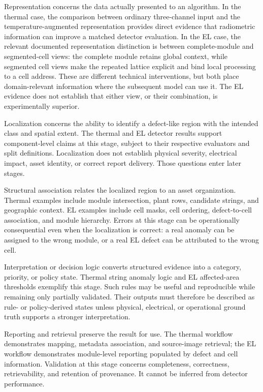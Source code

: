 \documentclass[12pt,a4paper]{report}
\begin{document}
Representation concerns the data actually presented to an algorithm. In the thermal case, the comparison between ordinary three-channel input and the temperature-augmented representation provides direct evidence that radiometric information can improve a matched detector evaluation. In the EL case, the relevant documented representation distinction is between complete-module and segmented-cell views: the complete module retains global context, while segmented cell views make the repeated lattice explicit and bind local processing to a cell address. These are different technical interventions, but both place domain-relevant information where the subsequent model can use it. The EL evidence does not establish that either view, or their combination, is experimentally superior.

Localization concerns the ability to identify a defect-like region with the intended class and spatial extent. The thermal and EL detector results support component-level claims at this stage, subject to their respective evaluators and split definitions. Localization does not establish physical severity, electrical impact, asset identity, or correct report delivery. Those questions enter later stages.

Structural association relates the localized region to an asset organization. Thermal examples include module intersection, plant rows, candidate strings, and geographic context. EL examples include cell masks, cell ordering, defect-to-cell association, and module hierarchy. Errors at this stage can be operationally consequential even when the localization is correct: a real anomaly can be assigned to the wrong module, or a real EL defect can be attributed to the wrong cell.

Interpretation or decision logic converts structured evidence into a category, priority, or policy state. Thermal string anomaly logic and EL affected-area thresholds exemplify this stage. Such rules may be useful and reproducible while remaining only partially validated. Their outputs must therefore be described as rule- or policy-derived states unless physical, electrical, or operational ground truth supports a stronger interpretation.

Reporting and retrieval preserve the result for use. The thermal workflow demonstrates mapping, metadata association, and source-image retrieval; the EL workflow demonstrates module-level reporting populated by defect and cell information. Validation at this stage concerns completeness, correctness, retrievability, and retention of provenance. It cannot be inferred from detector performance.
\end{document}
